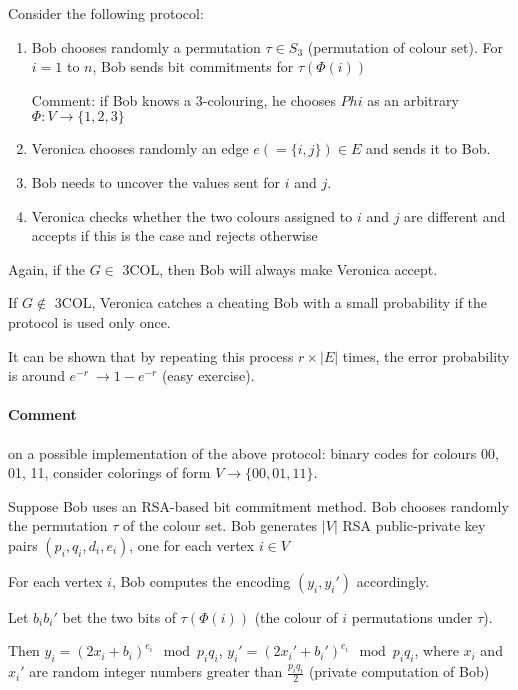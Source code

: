 \documentclass[11pt]{article}
\theoremstyle{definition}
\theoremstyle{definition}
\begin{document}
Consider the following protocol:
\begin{enumerate}
\item Bob chooses randomly a permutation $ \tau \in S_3 $ (permutation of colour set). For $ i = 1 $ to $ n $, Bob sends bit commitments for $ \tau(\Phi(i)) $

Comment: if Bob knows a 3-colouring, he chooses $ Phi $ as an arbitrary $ \Phi : V \rightarrow \{1, 2, 3\} $

\item Veronica chooses randomly an edge $ e (= \{i, j\}) \in E $ and sends it to Bob.

\item Bob needs to uncover the values sent for $ i $ and $ j $.

\item Veronica checks whether the two colours assigned to $ i $ and $ j $ are different and accepts if this is the case and rejects otherwise
\end{enumerate}

Again, if the $ G \in $ 3COL, then Bob will always make Veronica accept.

If $ G \not \in $ 3COL, Veronica catches a cheating Bob with a small probability if the protocol is used only once.

It can be shown that by repeating this process $ r \times | E | $ times, the error probability is around $ e^{-r} ~ \rightarrow 1 - e^{-r} $ (easy exercise).

\paragraph{Comment} on a possible implementation of the above protocol: binary codes for colours 00, 01, 11, consider colorings of form $ V \rightarrow \{00, 01, 11\} $. \medskip

Suppose Bob uses an RSA-based bit commitment method. Bob chooses randomly the permutation $ \tau $ of the colour set. Bob generates $ | V | $ RSA public-private key pairs $ (p_i, q_i, d_i, e_i ) $, one for each vertex $ i \in V $

For each vertex $ i $, Bob computes the encoding $ (y_i, y_i') $ accordingly.

Let $ b_i b_i' $ bet the two bits of $ \tau(\Phi(i)) $ (the colour of $ i $ permutations under $ \tau $).

Then $ y_i = (2x_i + b_i)^{e_i} \mod p_i q_i $, $ y_i' = (2x_i' + b_i')^{e_i} \mod p_i q_i $, where $ x_i $ and $ x_i'$ are random integer numbers greater than $ \frac{p_i q_i}{2} $ (private computation of Bob)
\end{document}
